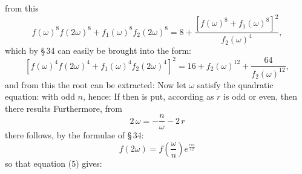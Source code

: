 from this
\[
f(\omega)^8f(2\omega)^8+f_1(\omega)^8f_2(2\omega)^8=8+\frac{[f(\omega)^8+f_1(\omega)^8]^2}{f_2(\omega)^4},
\]
which by \S\,34 can easily be brought into the form:
\[
[f(\omega)^4f(2\omega)^4+f_1(\omega)^4f_2(2\omega)^4]^2=16+f_2(\omega)^{12}+\frac{64}{f_2(\omega)^{12}},
\]
and from this the root can be extracted:
Now let $\omega$ satisfy the quadratic equation:
with odd $n$, hence:
If then
is put, according as $r$ is odd or even, then there results
Furthermore, from
\[
2\,\omega=-\frac{n}{\omega}-2\,r
\]
there follows, by the formulae of \S\,34:
\[
f(2\omega)=f\!\left(\frac{\omega}{n}\right)e^{\frac{r\pi i}{12}}
\]
so that equation (5) gives:
